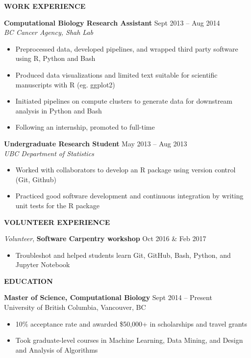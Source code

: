 \documentclass{res}
\renewcommand{\section}[1]{%
  \vspace{0.3in}%
  \centerline{\uppercase{\bf{#1}}}%
  \vspace{-6pt}}
\newcommand{\linehead}[2]{%
  {\bf #1} \hfill #2\\}
\newcommand{\linevolunteer}[3]{%
  {\sl #3}, {\bf #2} \hfill #1}%
\begin{document}
\begin{resume}
\section{Work Experience}

{\bf Computational Biology Research Assistant} \hfill Sept 2013 -- Aug 2014\\
{\it BC Cancer Agency, Shah Lab}
\begin{itemize}
  \item Preprocessed data, developed pipelines, and wrapped third party software using R, Python and Bash
  \item Produced data visualizations and limited text suitable for scientific manuscripts with R (eg. ggplot2)
  \item Initiated pipelines on compute clusters to generate data for downstream analysis in Python and Bash
  \item Following an internship, promoted to full-time
\end{itemize}

{\bf Undergraduate Research Student} \hfill May 2013 -- Aug 2013\\
{\it UBC Department of Statistics}
\begin{itemize}
  \item Worked with collaborators to develop an R package using version control (Git, Github)
  \item Practiced good software development and continuous integration by writing unit tests for the R package
\end{itemize}

\section{Volunteer experience}
\linevolunteer{Oct 2016 \& Feb 2017}{%
  Software Carpentry workshop}{%
  Volunteer}
\begin{itemize}
  \item Troubleshot and helped students learn Git, GitHub, Bash, Python, and Jupyter Notebook
\end{itemize}

\section{Education}
\linehead{Master of Science, Computational Biology}{Sept 2014 -- Present}
University of British Columbia, Vancouver, BC
\begin{itemize}
  \item 10\% acceptance rate and awarded \$50,000+ in scholarships and travel grants
  \item Took graduate-level courses in Machine Learning, Data Mining, and Design and Analysis of Algorithms
\end{itemize}
\pagebreak

\end{resume}
\end{document}
